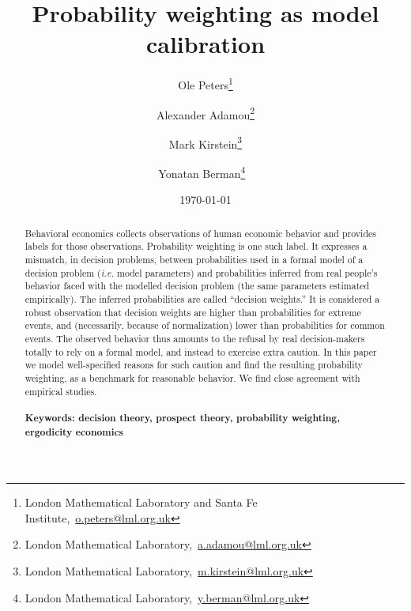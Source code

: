 \documentclass[11pt]{article}
\newcommand{\bc}{\begin{center}}
\newcommand{\ec}{\end{center}}
\newcommand{\red}[1]{\textcolor{red} {#1}}
\newcommand{\ie}{{\it i.e.}\xspace}
\numberwithin{equation}{section}
\begin{document}
\begin{titlepage}
\title{Probability weighting as model calibration}
\author{Ole Peters\footnote{London Mathematical Laboratory and Santa Fe Institute,~\url{o.peters@lml.org.uk}}  \and Alexander Adamou\footnote{London Mathematical Laboratory,~\url{a.adamou@lml.org.uk}} \and Mark Kirstein\footnote{London Mathematical Laboratory,~\url{m.kirstein@lml.org.uk}}  \and Yonatan Berman\footnote{London Mathematical Laboratory,~\url{y.berman@lml.org.uk}} \,\, %
}
\date{\today}
\maketitle


\begin{abstract}
\noindent 
Behavioral economics collects observations of human economic behavior and provides labels for those observations. 
Probability weighting is one such label. It expresses a mismatch, in decision problems, between probabilities used in a formal model of a decision problem (\ie model parameters) and probabilities inferred from real people's behavior faced with the modelled decision problem (the same parameters estimated empirically). The inferred probabilities are called ``decision weights.'' 
It is considered a robust observation that decision weights are higher than probabilities for extreme events, and (necessarily, because of normalization) lower than probabilities for common events.
The observed behavior thus amounts to the refusal by real decision-makers totally to rely on a formal model, and instead to exercise extra caution. In this paper we model well-specified reasons for such caution and find the resulting probability weighting, as a benchmark for reasonable behavior. We find close agreement with empirical studies.
\\
\\


\noindent\textbf{Keywords: decision theory, prospect theory, probability weighting, ergodicity economics}

\end{abstract}
\setcounter{page}{0}
\thispagestyle{empty}
\end{titlepage}
\pagebreak \newpage
\end{document}
